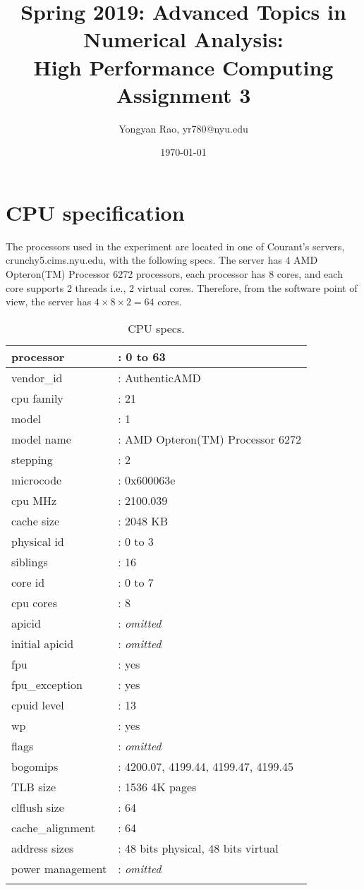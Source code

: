 \documentclass[amsmath,amssymb]{revtex4}
\begin{document}
\title{Spring 2019: Advanced Topics in Numerical Analysis:\\
High Performance Computing\\
Assignment 3}
\author{Yongyan Rao, yr780@nyu.edu}
\date{\today}
\maketitle

\section{\label{sec:sec0}CPU specification}
The processors used in the experiment are located in one of Courant's servers, crunchy5.cims.nyu.edu, with the following specs. The server has $4$ AMD Opteron(TM) Processor 6272 processors, each processor has 8 cores, and each core supports 2 threads i.e., 2 virtual cores. Therefore, from the software point of view, the server has $4\times8\times2 = 64$ cores.
\begin{longtable}{l l}
    \hline 
processor         &: 0 to 63\\ \hline
vendor\_id	&: AuthenticAMD \\ \hline
cpu family	&: 21\\ \hline
model		&: 1\\ \hline
model name	&: AMD Opteron(TM) Processor 6272\\ \hline
stepping	&: 2\\ \hline
microcode	&: 0x600063e\\ \hline
cpu MHz		&: 2100.039\\ \hline
cache size	&: 2048 KB\\ \hline
physical id	&: 0 to 3\\ \hline
siblings	&: 16\\ \hline
core id		&: 0 to 7\\ \hline
cpu cores	&: 8\\ \hline
apicid		&: {\it omitted}\\ \hline
initial apicid	&: {\it omitted}\\ \hline
fpu		&: yes\\ \hline
fpu\_exception	&: yes\\ \hline
cpuid level	&: 13\\ \hline
wp		&: yes\\ \hline
flags		&: {\it omitted}\\ \hline
bogomips	&: 4200.07, 4199.44, 4199.47, 4199.45\\ \hline
TLB size	&: 1536 4K pages\\ \hline
clflush size	&: 64\\ \hline
cache\_alignment	&: 64\\ \hline
address sizes	&: 48 bits physical, 48 bits virtual\\ \hline
power management&: {\it omitted}\\ \hline
\caption{CPU specs.}
\end{longtable}
\end{document}
